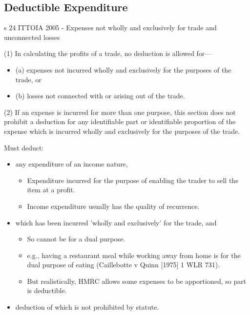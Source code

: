 \documentclass[
]{article}
\providecommand{\tightlist}{%
  \setlength{\itemsep}{0pt}\setlength{\parskip}{0pt}}
\newenvironment{env-b05156de-272c-4941-ad2d-f95253330136}
{
    \savenotes\tcolorbox[blanker,breakable,left=5pt,borderline west={2pt}{-4pt}{green}]
}
{
    \endtcolorbox\spewnotes
}
\begin{document}
\hypertarget{deductible-expenditure}{%
\subsection{Deductible Expenditure}\label{deductible-expenditure}}

\begin{env-b05156de-272c-4941-ad2d-f95253330136}

s 24 ITTOIA 2005 - Expenses not wholly and exclusively for trade and
unconnected losses

(1) In calculating the profits of a trade, no deduction is allowed
for---

\begin{itemize}
\tightlist
\item
  (a) expenses not incurred wholly and exclusively for the purposes of
  the trade, or
\item
  (b) losses not connected with or arising out of the trade.
\end{itemize}

(2) If an expense is incurred for more than one purpose, this section
does not prohibit a deduction for any identifiable part or identifiable
proportion of the expense which is incurred wholly and exclusively for
the purposes of the trade.

\end{env-b05156de-272c-4941-ad2d-f95253330136}

Must deduct:

\begin{itemize}
\tightlist
\item
  any expenditure of an income nature,

  \begin{itemize}
  \tightlist
  \item
    Expenditure incurred for the purpose of enabling the trader to sell
    the item at a profit.
  \item
    Income expenditure usually has the quality of recurrence.
  \end{itemize}
\item
  which has been incurred 'wholly and exclusively' for the trade, and

  \begin{itemize}
  \tightlist
  \item
    So cannot be for a dual purpose.
  \item
    e.g., having a restaurant meal while working away from home is for
    the dual purpose of eating (Caillebotte v Quinn {[}1975{]} 1 WLR
    731).
  \item
    But realistically, HMRC allows some expenses to be apportioned, so
    part is deductible.
  \end{itemize}
\item
  deduction of which is not prohibited by statute.
\end{itemize}
\end{document}
